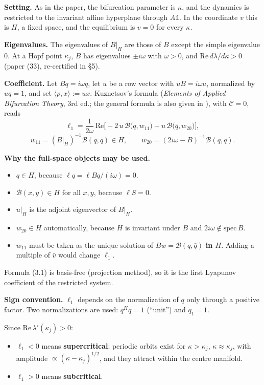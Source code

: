 \documentclass[11pt,a4paper]{report}
\begin{document}
\textbf{Setting.} As in the paper, the bifurcation parameter is \(\kappa\), and the dynamics is restricted to the
invariant affine hyperplane through \(A\mathbb 1\). In the coordinate \(v\) this is \(H\), a fixed space, and the
equilibrium is \(v=0\) for every \(\kappa\).

\textbf{Eigenvalues.} The eigenvalues of \(B|_H\) are those of \(B\) except the simple eigenvalue 0. At a Hopf point
\(\kappa_j\), \(B\) has eigenvalues \(\pm i\omega\) with \(\omega>0\), and \(\mathrm{Re}\,d\lambda/d\kappa>0\)
(paper (33), re-certified in §5).

\textbf{Coefficient.} Let \(Bq=i\omega q\), let \(u\) be a row vector with \(uB=i\omega u\), normalized by
\(uq=1\), and set \(\langle p,x\rangle:=ux\). Kuznetsov's formula (\emph{Elements of Applied Bifurcation Theory}, 3rd
ed.; the general formula is also given in \cite{kuznetsov2006}), with \(\mathcal C=0\), reads
\[\ell_1=\frac1{2\omega}\,\mathrm{Re}\Big[-2\,u\,\mathcal B\big(q,w_{11}\big)+u\,\mathcal B\big(\bar q,w_{20}\big)\Big],\]
\[w_{11}=(B|_H)^{-1}\mathcal B(q,\bar q)\in H,\qquad w_{20}=(2i\omega-B)^{-1}\mathcal B(q,q). \tag{3.1}\]

\textbf{Why the full-space objects may be used.}
\begin{itemize}
\tightlist
\item \(q\in H\), because \(\boldsymbol\ell q=\boldsymbol\ell Bq/(i\omega)=0\).
\item \(\mathcal B(x,y)\in H\) for all \(x,y\), because \(\boldsymbol\ell S=0\).
\item \(u|_H\) is the adjoint eigenvector of \(B|_H\).
\item \(w_{20}\in H\) automatically, because \(H\) is invariant under \(B\) and \(2i\omega\notin\mathrm{spec}\,B\).
\item \(w_{11}\) must be taken as the unique solution of \(Bw=\mathcal B(q,\bar q)\) \textbf{in \(H\)}. Adding a multiple of
\(\bar v\) would change \(\ell_1\).
\end{itemize}

Formula (3.1) is basis-free (projection method), so it is the first Lyapunov coefficient of the restricted system.

\textbf{Sign convention.} \(\ell_1\) depends on the normalization of \(q\) only through a positive factor. Two
normalizations are used: \(q^Hq=1\) (``unit'') and \(q_1=1\).

Since \(\mathrm{Re}\,\lambda'(\kappa_j)>0\):
\begin{itemize}
\tightlist
\item \(\ell_1<0\) means \textbf{supercritical}: periodic orbits exist for \(\kappa>\kappa_j\), \(\kappa\approx\kappa_j\),
with amplitude \(\propto(\kappa-\kappa_j)^{1/2}\), and they attract within the centre manifold.
\item \(\ell_1>0\) means \textbf{subcritical}.
\end{itemize}
\end{document}
